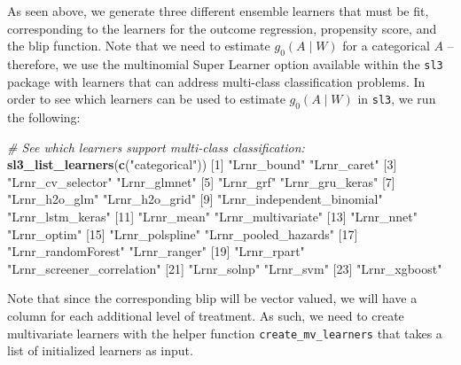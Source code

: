 \documentclass[12pt, krantz2,]{krantz}
\newenvironment{Shaded}{\begin{snugshade}}{\end{snugshade}}
\newcommand{\CommentTok}[1]{\textcolor[rgb]{0.37,0.37,0.37}{\textit{#1}}}
\newcommand{\DecValTok}[1]{\textcolor[rgb]{0.06,0.06,0.06}{#1}}
\newcommand{\KeywordTok}[1]{\textcolor[rgb]{0.27,0.27,0.27}{\textbf{#1}}}
\newcommand{\NormalTok}[1]{#1}
\newcommand{\StringTok}[1]{\textcolor[rgb]{0.5,0.5,0.5}{#1}}
\theoremstyle{definition}
\theoremstyle{definition}
\theoremstyle{definition}
\newcommand{\1}{\mathbbm{1}}
\begin{document}
As seen above, we generate three different ensemble learners that must be fit,
corresponding to the learners for the outcome regression, propensity score, and
the blip function. Note that we need to estimate \(g_0(A \mid W)\) for a
categorical \(A\) -- therefore, we use the multinomial Super Learner option
available within the \texttt{sl3} package with learners that can address multi-class
classification problems. In order to see which learners can be used to estimate
\(g_0(A \mid W)\) in \texttt{sl3}, we run the following:

\begin{Shaded}
\begin{Highlighting}[]
\CommentTok{# See which learners support multi-class classification:}
\KeywordTok{sl3_list_learners}\NormalTok{(}\KeywordTok{c}\NormalTok{(}\StringTok{"categorical"}\NormalTok{))}
\NormalTok{ [}\DecValTok{1}\NormalTok{] }\StringTok{"Lrnr_bound"}                \StringTok{"Lrnr_caret"}               
\NormalTok{ [}\DecValTok{3}\NormalTok{] }\StringTok{"Lrnr_cv_selector"}          \StringTok{"Lrnr_glmnet"}              
\NormalTok{ [}\DecValTok{5}\NormalTok{] }\StringTok{"Lrnr_grf"}                  \StringTok{"Lrnr_gru_keras"}           
\NormalTok{ [}\DecValTok{7}\NormalTok{] }\StringTok{"Lrnr_h2o_glm"}              \StringTok{"Lrnr_h2o_grid"}            
\NormalTok{ [}\DecValTok{9}\NormalTok{] }\StringTok{"Lrnr_independent_binomial"} \StringTok{"Lrnr_lstm_keras"}          
\NormalTok{[}\DecValTok{11}\NormalTok{] }\StringTok{"Lrnr_mean"}                 \StringTok{"Lrnr_multivariate"}        
\NormalTok{[}\DecValTok{13}\NormalTok{] }\StringTok{"Lrnr_nnet"}                 \StringTok{"Lrnr_optim"}               
\NormalTok{[}\DecValTok{15}\NormalTok{] }\StringTok{"Lrnr_polspline"}            \StringTok{"Lrnr_pooled_hazards"}      
\NormalTok{[}\DecValTok{17}\NormalTok{] }\StringTok{"Lrnr_randomForest"}         \StringTok{"Lrnr_ranger"}              
\NormalTok{[}\DecValTok{19}\NormalTok{] }\StringTok{"Lrnr_rpart"}                \StringTok{"Lrnr_screener_correlation"}
\NormalTok{[}\DecValTok{21}\NormalTok{] }\StringTok{"Lrnr_solnp"}                \StringTok{"Lrnr_svm"}                 
\NormalTok{[}\DecValTok{23}\NormalTok{] }\StringTok{"Lrnr_xgboost"}             
\end{Highlighting}
\end{Shaded}

Note that since the corresponding blip will be vector valued, we will have a
column for each additional level of treatment. As such, we need to create
multivariate learners with the helper function \texttt{create\_mv\_learners} that takes a
list of initialized learners as input.
\end{document}
